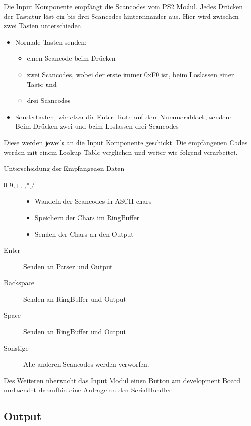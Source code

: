 Die Input Komponente empfängt die Scancodes vom PS2 Modul. Jedes Drücken der Tastatur löst ein bis drei Scancodes hintereinander aus.
Hier wird zwischen zwei Tasten unterschieden. 
\begin{itemize}
 \item Normale Tasten senden:\\
	\begin{itemize}
		\item einen Scancode beim Drücken
		\item zwei Scancodes, wobei der erste immer 0xF0 ist, beim Loslassen einer Taste und
		\item drei Scancodes 

	\end{itemize}
  \item Sondertasten, wie etwa die Enter Taste auf dem Nummernblock, senden:\\
  	Beim Drücken zwei und beim Loslassen drei Scancodes 
 \end{itemize}
Diese werden jeweils an die Input Komponente geschickt.
Die empfangenen Codes werden mit einem Lookup Table verglichen 
und weiter wie folgend verarbeitet.

Unterscheidung der Empfangenen Daten:
\begin{description}
 \item[0-9,+,-,*,/]
	\begin{itemize}
		\item Wandeln der Scancodes in ASCII chars 
		\item Speichern der Chars im RingBuffer
		\item Senden der Chars an den Output
	\end{itemize}
 \item[Enter] Senden an Parser und Output
 \item[Backspace] Senden an RingBuffer und Output
 \item[Space] Senden an RingBuffer und Output
 \item[Sonstige] Alle anderen Scancodes werden verworfen.
 \end{description}

Des Weiteren überwacht das Input Modul einen Button am development Board und sendet
daraufhin eine Anfrage an den SerialHandler

\subsection{Output}

